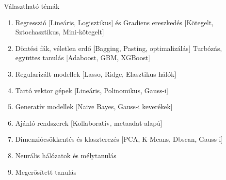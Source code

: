 \documentclass[english, aspectratio=169]{beamer}
\begin{document}
\begin{frame}{Választható témák}
\begin{enumerate}
	\item Regresszió [Lineáris, Logisztikus] és Gradiens ereszkedés [Kötegelt, Sztochasztikus, Mini-kötegelt]
	\item Döntési fák, véletlen erdő [Bagging, Pasting, optimalizálás] Turbózás, együttes tanulás [Adaboost, GBM, XGBoost]
	\item Regularizált modellek [Lasso, Ridge, Elasztikus hálók]
	\item Tartó vektor gépek [Lineáris, Polinomikus, Gauss-i]
	\item Generatív modellek [Naive Bayes, Gauss-i keverékek]
	\item Ajánló rendszerek [Kollaboratív, metaadat-alapú]
	\item Dimenziócsökkentés és klaszterezés [PCA, K-Means, Dbscan, Gauss-i]
	\item Neurális hálózatok és mélytanulás
	\item Megerősített tanulás
\end{enumerate}
\end{frame}
\end{document}
